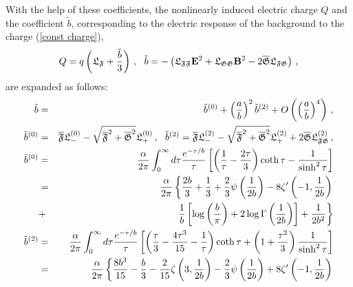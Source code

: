 \documentclass[12pt]{article}
\begin{document}
\begin{appendices}
With the help of these coefficients, the nonlinearly induced electric charge 
$Q$ and the coefficient $\tilde{b}$, corresponding to the electric response
of the background to the charge (\ref{const charge}),%
\begin{equation}
Q=q\left( \mathfrak{L}_{\mathfrak{F}}+\frac{\tilde{b}}{3}\right) \,,\ \ 
\tilde{b}=-\left( \mathfrak{L}_{\mathfrak{FF}}\mathbf{E}^{2}+\mathfrak{L}_{%
\mathfrak{GG}}\mathbf{B}^{2}-2\overline{\mathfrak{G}}\mathfrak{L}_{\mathfrak{%
FG}}\right) \,,  \label{apb5}
\end{equation}%
are expanded as follows:%
\begin{eqnarray}
\tilde{b} &=&\tilde{b}^{\left( 0\right) }+\left( \frac{a}{b}\right) ^{2}%
\tilde{b}^{\left( 2\right) }+O\left( \left( \frac{a}{b}\right) ^{4}\right)
\,,  \notag \\
\tilde{b}^{\left( 0\right) } &=&\overline{\mathfrak{F}}\mathfrak{L}%
_{-}^{\left( 0\right) }-\sqrt{\overline{\mathfrak{F}}^{2}+\overline{%
\mathfrak{G}}^{2}}\mathfrak{L}_{+}^{\left( 0\right) }\,,\ \ \tilde{b}%
^{\left( 2\right) }=\overline{\mathfrak{F}}\mathfrak{L}_{-}^{\left( 2\right)
}-\sqrt{\overline{\mathfrak{F}}^{2}+\overline{\mathfrak{G}}^{2}}\mathfrak{L}%
_{+}^{\left( 2\right) }+2\overline{\mathfrak{G}}\mathfrak{L}_{\mathfrak{FG}%
}^{\left( 2\right) }\,,  \notag \\
\tilde{b}^{\left( 0\right) } &=&\frac{\alpha }{2\pi }\int_{0}^{\infty }d\tau 
\frac{e^{-\tau /b}}{\tau }\left[ \left( \frac{1}{\tau }-\frac{2\tau }{3}%
\right) \coth \tau -\frac{1}{\sinh ^{2}\tau }\right]  \notag \\
&=&\frac{\alpha }{2\pi }\left\{ \frac{2b}{3}+\frac{1}{3}+\frac{2}{3}\psi
\left( \frac{1}{2b}\right) -8\zeta ^{\prime }\left( -1,\frac{1}{2b}\right)
\right.  \notag \\
&+&\left. \frac{1}{b}\left[ \log \left( \frac{b}{\pi }\right) +2\log \Gamma
\left( \frac{1}{2b}\right) \right] +\frac{1}{2b^{2}}\right\}  \notag \\
\tilde{b}^{\left( 2\right) } &=&\frac{\alpha }{2\pi }\int_{0}^{\infty }d\tau 
\frac{e^{-\tau /b}}{\tau }\left[ \left( \frac{\tau }{3}-\frac{4\tau ^{3}}{15}%
-\frac{1}{\tau }\right) \coth \tau +\left( 1+\frac{\tau ^{2}}{3}\right) 
\frac{1}{\sinh ^{2}\tau }\right]  \notag \\
&=&\frac{\alpha }{2\pi }\left\{ \frac{8b^{3}}{15}-\frac{b}{3}-\frac{2}{15}%
\zeta \left( 3,\frac{1}{2b}\right) -\frac{2}{3}\psi \left( \frac{1}{2b}%
\right) +8\zeta ^{\prime }\left( -1,\frac{1}{2b}\right) \right.  \notag \\

\end{eqnarray}
\end{appendices}
\end{document}
